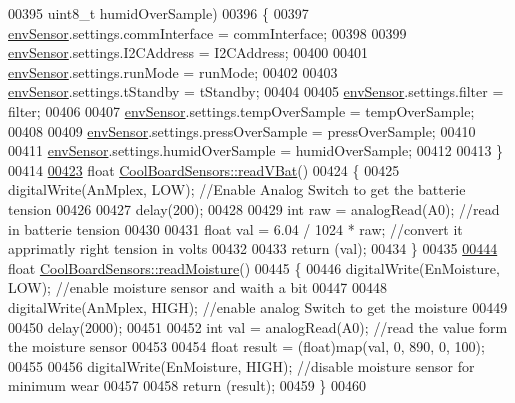 \begin{DoxyCode}
00395                            uint8\_t humidOverSample)
00396 \{
00397   \hyperlink{class_cool_board_sensors_a868e38985e9a2412829fa2790ca13e2e}{envSensor}.settings.commInterface = commInterface;      
00398   
00399   \hyperlink{class_cool_board_sensors_a868e38985e9a2412829fa2790ca13e2e}{envSensor}.settings.I2CAddress = I2CAddress;
00400   
00401   \hyperlink{class_cool_board_sensors_a868e38985e9a2412829fa2790ca13e2e}{envSensor}.settings.runMode = runMode; 
00402   
00403   \hyperlink{class_cool_board_sensors_a868e38985e9a2412829fa2790ca13e2e}{envSensor}.settings.tStandby = tStandby; 
00404   
00405   \hyperlink{class_cool_board_sensors_a868e38985e9a2412829fa2790ca13e2e}{envSensor}.settings.filter = filter; 
00406   
00407   \hyperlink{class_cool_board_sensors_a868e38985e9a2412829fa2790ca13e2e}{envSensor}.settings.tempOverSample = tempOverSample;
00408   
00409   \hyperlink{class_cool_board_sensors_a868e38985e9a2412829fa2790ca13e2e}{envSensor}.settings.pressOverSample = pressOverSample;
00410   
00411   \hyperlink{class_cool_board_sensors_a868e38985e9a2412829fa2790ca13e2e}{envSensor}.settings.humidOverSample = humidOverSample;
00412 
00413 \}
00414 
\hyperlink{class_cool_board_sensors_a6944b6ea7bce8e2fce1b434acfd9d5f3}{00423} \textcolor{keywordtype}{float} \hyperlink{class_cool_board_sensors_a6944b6ea7bce8e2fce1b434acfd9d5f3}{CoolBoardSensors::readVBat}()
00424 \{
00425     digitalWrite(AnMplex, LOW);                                  \textcolor{comment}{//Enable Analog Switch to get the batterie
       tension}
00426     
00427     delay(200);
00428     
00429     \textcolor{keywordtype}{int} raw = analogRead(A0);                                    \textcolor{comment}{//read in batterie tension}
00430     
00431     \textcolor{keywordtype}{float} val = 6.04 / 1024 * raw;                               \textcolor{comment}{//convert it apprimatly right tension in
       volts}
00432 
00433     \textcolor{keywordflow}{return} (val);   
00434 \}
00435 
\hyperlink{class_cool_board_sensors_a8761bff50373c485f4465c8db47d0633}{00444} \textcolor{keywordtype}{float} \hyperlink{class_cool_board_sensors_a8761bff50373c485f4465c8db47d0633}{CoolBoardSensors::readMoisture}()
00445 \{
00446       digitalWrite(EnMoisture, LOW);                 \textcolor{comment}{//enable moisture sensor and waith a bit}
00447       
00448       digitalWrite(AnMplex, HIGH);          \textcolor{comment}{//enable analog Switch to get the moisture}
00449       
00450       delay(2000);
00451       
00452       \textcolor{keywordtype}{int} val = analogRead(A0);                       \textcolor{comment}{//read the value form the moisture sensor}
00453       
00454       \textcolor{keywordtype}{float} result = (float)map(val, 0, 890, 0, 100);   
00455 
00456       digitalWrite(EnMoisture, HIGH);                  \textcolor{comment}{//disable moisture sensor for minimum wear}
00457       
00458       \textcolor{keywordflow}{return} (result);
00459 \}
00460 
\end{DoxyCode}
